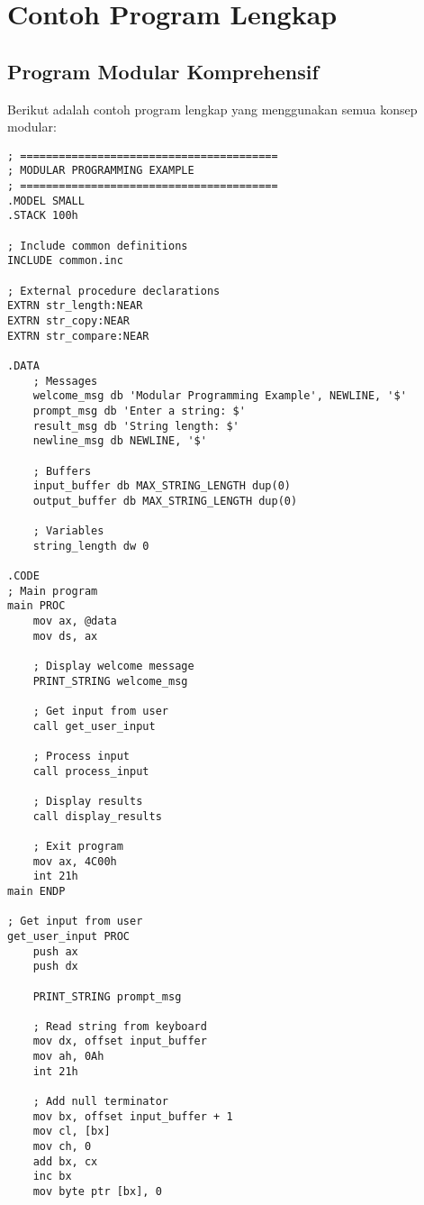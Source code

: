 \documentclass[../main.tex]{subfiles}
\begin{document}
    \section{Contoh Program Lengkap}
        \subsection{Program Modular Komprehensif}
            Berikut adalah contoh program lengkap yang menggunakan semua konsep modular:

            \begin{lstlisting}[language={[x86masm]Assembler}, caption=Program Modular Lengkap, label={lst:complete-modular-program}]
; ========================================
; MODULAR PROGRAMMING EXAMPLE
; ========================================
.MODEL SMALL
.STACK 100h

; Include common definitions
INCLUDE common.inc

; External procedure declarations
EXTRN str_length:NEAR
EXTRN str_copy:NEAR
EXTRN str_compare:NEAR

.DATA
    ; Messages
    welcome_msg db 'Modular Programming Example', NEWLINE, '$'
    prompt_msg db 'Enter a string: $'
    result_msg db 'String length: $'
    newline_msg db NEWLINE, '$'
    
    ; Buffers
    input_buffer db MAX_STRING_LENGTH dup(0)
    output_buffer db MAX_STRING_LENGTH dup(0)
    
    ; Variables
    string_length dw 0

.CODE
; Main program
main PROC
    mov ax, @data
    mov ds, ax
    
    ; Display welcome message
    PRINT_STRING welcome_msg
    
    ; Get input from user
    call get_user_input
    
    ; Process input
    call process_input
    
    ; Display results
    call display_results
    
    ; Exit program
    mov ax, 4C00h
    int 21h
main ENDP

; Get input from user
get_user_input PROC
    push ax
    push dx
    
    PRINT_STRING prompt_msg
    
    ; Read string from keyboard
    mov dx, offset input_buffer
    mov ah, 0Ah
    int 21h
    
    ; Add null terminator
    mov bx, offset input_buffer + 1
    mov cl, [bx]
    mov ch, 0
    add bx, cx
    inc bx
    mov byte ptr [bx], 0
    

\end{lstlisting}
\end{document}

